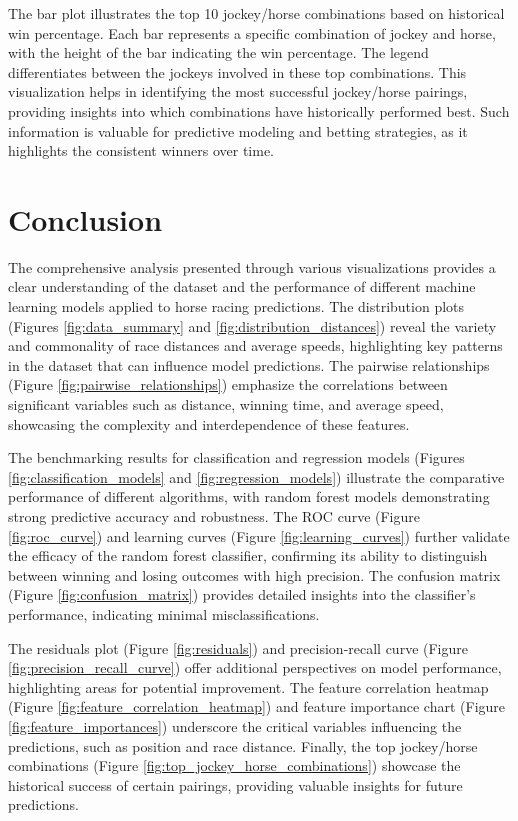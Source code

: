 \documentclass{article}
\begin{document}
The bar plot illustrates the top 10 jockey/horse combinations based on historical win percentage. Each bar represents a specific combination of jockey and horse, with the height of the bar indicating the win percentage. The legend differentiates between the jockeys involved in these top combinations. This visualization helps in identifying the most successful jockey/horse pairings, providing insights into which combinations have historically performed best. Such information is valuable for predictive modeling and betting strategies, as it highlights the consistent winners over time.

\section{Conclusion}
The comprehensive analysis presented through various visualizations provides a clear understanding of the dataset and the performance of different machine learning models applied to horse racing predictions. The distribution plots (Figures \ref{fig:data_summary} and \ref{fig:distribution_distances}) reveal the variety and commonality of race distances and average speeds, highlighting key patterns in the dataset that can influence model predictions. The pairwise relationships (Figure \ref{fig:pairwise_relationships}) emphasize the correlations between significant variables such as distance, winning time, and average speed, showcasing the complexity and interdependence of these features.

The benchmarking results for classification and regression models (Figures \ref{fig:classification_models} and \ref{fig:regression_models}) illustrate the comparative performance of different algorithms, with random forest models demonstrating strong predictive accuracy and robustness. The ROC curve (Figure \ref{fig:roc_curve}) and learning curves (Figure \ref{fig:learning_curves}) further validate the efficacy of the random forest classifier, confirming its ability to distinguish between winning and losing outcomes with high precision. The confusion matrix (Figure \ref{fig:confusion_matrix}) provides detailed insights into the classifier's performance, indicating minimal misclassifications.

The residuals plot (Figure \ref{fig:residuals}) and precision-recall curve (Figure \ref{fig:precision_recall_curve}) offer additional perspectives on model performance, highlighting areas for potential improvement. The feature correlation heatmap (Figure \ref{fig:feature_correlation_heatmap}) and feature importance chart (Figure \ref{fig:feature_importances}) underscore the critical variables influencing the predictions, such as position and race distance. Finally, the top jockey/horse combinations (Figure \ref{fig:top_jockey_horse_combinations}) showcase the historical success of certain pairings, providing valuable insights for future predictions.
\end{document}
